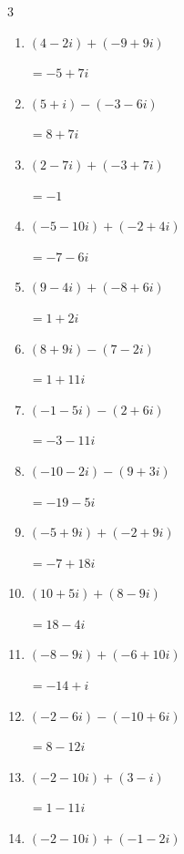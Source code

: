\begin{multicols}{3}
\begin{enumerate}
  \item $\displaystyle (4-2i) + (-9+9i)$

        $\displaystyle =-5+7i$

  \item $\displaystyle (5+i) - (-3-6i)$

        $\displaystyle =8+7i$

  \item $\displaystyle (2-7i) + (-3+7i)$

        $\displaystyle =-1$

  \item $\displaystyle (-5-10i) + (-2+4i)$

        $\displaystyle =-7-6i$

  \item $\displaystyle (9-4i) + (-8+6i)$

        $\displaystyle =1+2i$

  \item $\displaystyle (8+9i) - (7-2i)$

        $\displaystyle =1+11i$

  \item $\displaystyle (-1-5i) - (2+6i)$

        $\displaystyle =-3-11i$

  \item $\displaystyle (-10-2i) - (9+3i)$

        $\displaystyle =-19-5i$

  \item $\displaystyle (-5+9i) + (-2+9i)$

        $\displaystyle =-7+18i$

  \item $\displaystyle (10+5i) + (8-9i)$

        $\displaystyle =18-4i$

  \item $\displaystyle (-8-9i) + (-6+10i)$

        $\displaystyle =-14+i$

  \item $\displaystyle (-2-6i) - (-10+6i)$

        $\displaystyle =8-12i$

  \item $\displaystyle (-2-10i) + (3-i)$

        $\displaystyle =1-11i$

  \item $\displaystyle (-2-10i) + (-1-2i)$


\end{enumerate}
\end{multicols}
